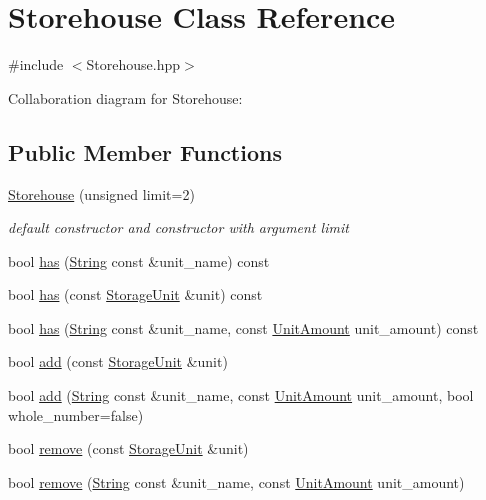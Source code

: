 \hypertarget{classStorehouse}{}\section{Storehouse Class Reference}
\label{classStorehouse}


{\ttfamily \#include $<$Storehouse.\+hpp$>$}



Collaboration diagram for Storehouse\+:
\subsection*{Public Member Functions}
\begin{DoxyCompactItemize}
\item 
\hyperlink{classStorehouse_ac669678b559e7c33b980e80fc0d80d05}{Storehouse} (unsigned limit=2)
\begin{DoxyCompactList}\small\item\em default constructor and constructor with argument limit \end{DoxyCompactList}\item 
bool \hyperlink{classStorehouse_a6eeb0b35715de38d45e92d207928323a}{has} (\hyperlink{classString}{String} const \&unit\+\_\+name) const
\item 
bool \hyperlink{classStorehouse_a0b06fb6fa2819193775c2aba04e8ff5c}{has} (const \hyperlink{classStorageUnit}{Storage\+Unit} \&unit) const
\item 
bool \hyperlink{classStorehouse_a757d0c9fccad409c6f5bdd502e081e7b}{has} (\hyperlink{classString}{String} const \&unit\+\_\+name, const \hyperlink{StorageUnit_8hpp_a13b2ba6b0400e1aa0b57282bd1228f20}{Unit\+Amount} unit\+\_\+amount) const
\item 
bool \hyperlink{classStorehouse_abd7448c73850f9281174e13a918e4c14}{add} (const \hyperlink{classStorageUnit}{Storage\+Unit} \&unit)
\item 
bool \hyperlink{classStorehouse_aeb07631e19d9fa3306b49988ce8ce6fb}{add} (\hyperlink{classString}{String} const \&unit\+\_\+name, const \hyperlink{StorageUnit_8hpp_a13b2ba6b0400e1aa0b57282bd1228f20}{Unit\+Amount} unit\+\_\+amount, bool whole\+\_\+number=false)
\item 
bool \hyperlink{classStorehouse_abce48d8f965079715a4c93f1702ffcbf}{remove} (const \hyperlink{classStorageUnit}{Storage\+Unit} \&unit)
\item 
bool \hyperlink{classStorehouse_a1c65143fca17ea7fda18e0b9b10b4d70}{remove} (\hyperlink{classString}{String} const \&unit\+\_\+name, const \hyperlink{StorageUnit_8hpp_a13b2ba6b0400e1aa0b57282bd1228f20}{Unit\+Amount} unit\+\_\+amount)
\end{DoxyCompactItemize}
